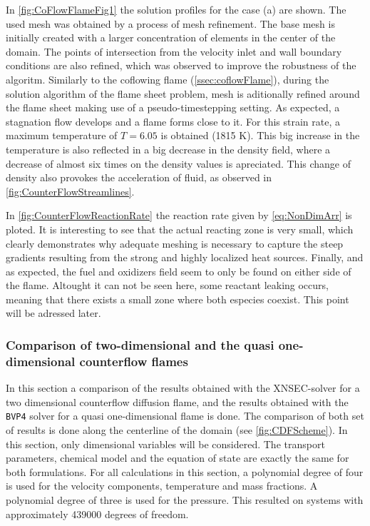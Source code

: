 In \cref{fig:CoFlowFlameFig1} the solution profiles for the case (a) are shown. The used mesh was obtained by a process of mesh refinement. The base mesh is initially created with a larger concentration of elements in the center of the domain. The points of intersection from the velocity inlet and wall boundary conditions are also refined, which was observed to improve the robustness of the algoritm. Similarly to the coflowing flame (\cref{ssec:coflowFlame}), during the solution algorithm of the flame sheet problem, mesh is aditionally refined around the flame sheet making use of a pseudo-timestepping setting.
As expected, a stagnation flow develops and a flame forms close to it. For this strain rate, a maximum temperature of $T = 6.05$ is obtained (1815 $\si{\kelvin}$). This big increase in the temperature is also reflected in a big decrease in the density field, where a decrease of almost six times on the density values is apreciated. This change of density also provokes the acceleration of fluid, as observed in \cref{fig:CounterFlowStreamlines}. 

In \cref{fig:CounterFlowReactionRate} the reaction rate given by \cref{eq:NonDimArr} is ploted. It is interesting to see that the actual reacting zone is very small, which clearly demonstrates why adequate meshing is necessary to capture the steep gradients resulting from the strong and highly localized heat sources. Finally, and as expected, the fuel and oxidizers field seem to only be found on either side of the flame. Altought it can not be seen here, some reactant leaking occurs, meaning that there exists a small zone where both especies coexist. This point will be adressed later. 

\subsubsection{Comparison of two-dimensional and the quasi one-dimensional counterflow flames}
In this section a comparison of the results obtained with the XNSEC-solver for a two dimensional counterflow diffusion flame, and the results obtained with the \lstinline|BVP4| solver for a quasi one-dimensional flame is done. The comparison of both set of results is done along the centerline of the domain (see \cref{fig:CDFScheme}). In this section, only dimensional variables will be considered. The transport parameters, chemical model and the equation of state are exactly the same for both formulations. For all calculations in this section, a polynomial degree of four is used for the velocity components, temperature and mass fractions. A polynomial degree of three is used for the pressure. This resulted on systems with approximately 439000 degrees of freedom. 
 
